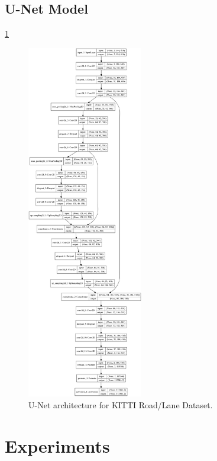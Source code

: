 \documentclass[10pt,twocolumn,letterpaper]{article}
\begin{document}
\subsection{U-Net Model} \label{ssec:unet_model}

\ref{fig:unet_model}

\begin{figure}[ht]
  \centering
  \includegraphics[width=0.45\textwidth]{kitti_unet_plot.png}
  \caption{U-Net architecture for KITTI Road/Lane Dataset.}
  \label{fig:unet_model}
\end{figure}

\section{Experiments} \label{sec:experiments}
\end{document}
